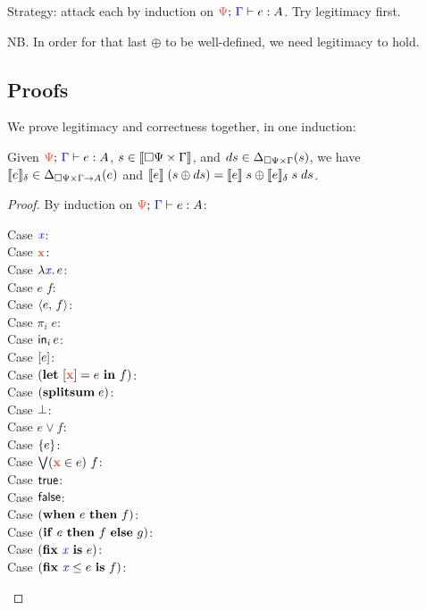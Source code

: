 \documentclass{article}
\begin{document}
Strategy: attack each by induction on $\J{\GP}{\GG}{e}{A}$. Try legitimacy
first.

NB. In order for that last $\oplus$ to be well-defined, we need legitimacy to
hold.


\subsection{Proofs}

We prove legitimacy and correctness together, in one induction:

\begin{lemma}
  Given $\J{\GP}{\GG}{e}{A}$, $s \in {\llbracket{\square{\Psi} \times\Gamma}\rrbracket}$, and $ds \in
  \Delta_{\square{\Psi} \times \Gamma}({s})$, we have $\llbracket{e}\rrbracket_\delta \in \Delta_{\square{\Psi} \times
    \Gamma \to A}({e})$ and $\llbracket{e}\rrbracket \;(s \oplus ds) = \llbracket{e}\rrbracket\;s \oplus
  \llbracket{e}\rrbracket_\delta\;s\;ds$.
\end{lemma}

\begin{proof}
  By induction on $\J{\GP}{\GG}{e}{A}$:

  \begin{description}
    \item[Case ${\color{blue}{\mathit{x}}}$:]
    \item[Case $\d x$:]
    \item[Case $\lambda{\ensuremath{{\color{blue}{\mathit{x}}}}}.\, e$:]
    \item[Case $e\;f$:]
    \item[Case $\langle{{e},\,{f}}\rangle$:]
    \item[Case $\pi_i\;e$:]
    \item[Case $\mathsf{in}_{i}\,{e}$:]
    \item[Case $[{e}]$:]
    \item[Case $(\letdisc{\d{x}}{e}{f})$:]
    \item[Case $(\mathbf{splitsum}\; {e})$:]
    \item[Case $\bot$:]
    \item[Case $e \vee f$:]
    \item[Case $\{{e}\}$:]
    \item[Case $\setelim{\d{x}}{e}{f}$:]
    \item[Case $\mathsf{true}$:]
    \item[Case $\mathsf{false}$:]
    \item[Case $(\mathbf{when}~{e}~\mathbf{then}~{f})$:]
    \item[Case $(\mathbf{if}~{e}~\mathbf{then}~{f}~\mathbf{else}~{g})$:]
    \item[Case $(\mathbf{fix}~{{\color{blue}{\mathit{x}}}}~\mathbf{is}~ e)$:]
    \item[Case $(\mathbf{fix}~{{{\color{blue}{\mathit{x}}}} \le {e}}~\mathbf{is}~{f})$:]
  \end{description}
\end{proof}
\end{document}
